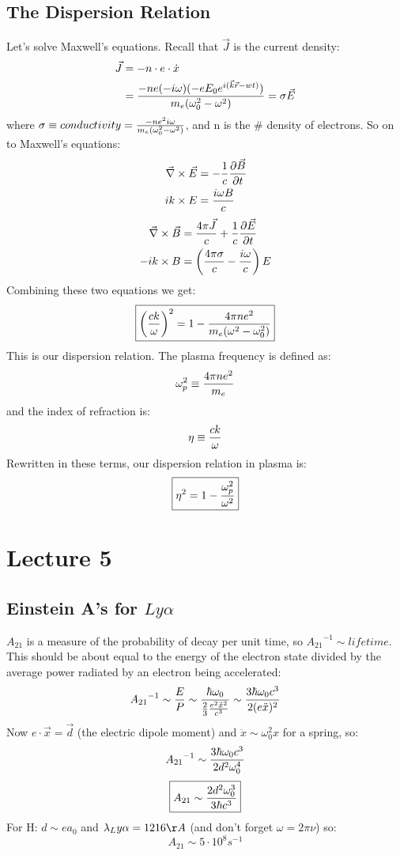 \documentclass[11pt]{article}
\def\.{\dot}
\def\tr{\nabla}
\def\dce{\vec\tr\times\vec E}
\def\dcb{\vec\tr\times\vec B}
\def\wz{\omega_0}
\def\ef{\vec E}
\def\ato{{A_{21}}}
\def\bfield{{\vec B}}
\def\e#1{\cdot10^{#1}}
\begin{document}
\subsection*{ The Dispersion Relation}

Let's solve Maxwell's equations.  Recall that $\vec J$ is the current density:
$$\begin{aligned}\vec J&=-n\cdot e\cdot\.x\\ 
&={-ne(-i\omega)(-eE_0\eikrwt)\over m_e(\wz^2-\omega^2)}=\sigma\ef\\ \end{aligned}$$
where $\sigma\equiv conductivity={-ne^2i\omega\over m_e(\wz^2-\omega^2)}$, and
n is the \# density of electrons.
So on to Maxwell's equations:
$$\begin{aligned}\dce&=-{1\over c}{\partial\bfield\over\partial t}\\ 
ik\times E&={i\omega B\over c}\\ \end{aligned}$$
$$\begin{aligned}\dcb&={4\pi\vec J\over c}+{1\over c}{\partial\ef\over\partial t}\\ 
-ik\times B&=\left({4\pi\sigma\over c}-{i\omega\over c}\right)E\\ \end{aligned}$$
Combining these two equations we get:
$$\boxed{\left({ck\over\omega}\right)^2=1-{4\pi ne^2\over 
m_e(\omega^2-\wz^2)}}$$
This is our dispersion relation.  The plasma frequency is defined as:
$$\omega_p^2\equiv {4\pi ne^2\over m_e}$$
and the index of refraction is:
$$\eta\equiv{ck\over\omega}$$
Rewritten in these terms, our dispersion relation in plasma is:
$$\boxed{\eta^2=1-{\omega_p^2\over\omega^2}}$$

\section*{ Lecture 5 }

\def\lya{Ly\alpha}
\subsection*{ Einstein A's for $\lya$}

$\ato$ is a measure of the probability of decay per unit time, so
$\ato^{-1}\sim lifetime$.  This should be about
equal to the energy of the electron state divided by the average power radiated
by an electron being accelerated:
$$\ato^{-1}\sim{E\over P}\sim{\hbar\omega_0\over{2\over3}{e^2\ddot x^2
\over c^3}}
\sim{3\hbar\omega_0c^3\over2(e\ddot x)^2}$$
Now $e\cdot\vec x=\vec d$ (the electric dipole moment) and
$\ddot x\sim\omega_0^2x$ for a spring, so:
$$\ato^{-1}\sim{3\hbar\wz c^3\over2d^2\wz^4}$$
$$\boxed{\ato\sim{2d^2\wz^3\over3\hbar c^3}}$$
For H: $d\sim ea_0$ and $\lambda_\lya=1216\AA$ (and don't forget $\omega=2\pi\nu$) so:
$$\ato\sim5\e8s^{-1}$$
\end{document}
